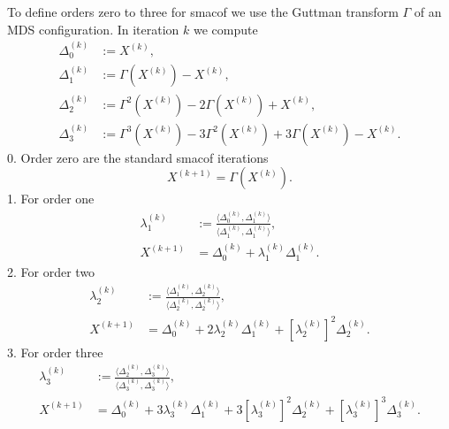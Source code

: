 \documentclass[
  12pt,
  letterpaper,
  DIV=11,
  numbers=noendperiod]{scrartcl}
\begin{document}
To define orders zero to three for smacof we use the Guttman transform
\(\Gamma\) of an MDS configuration. In iteration \(k\) we compute
\begin{subequations}
  \begin{align}
    \Delta_0^{(k)} & := X^{(k)},                                                             \\
    \Delta_1^{(k)} & := \Gamma(X^{(k)}) - X^{(k)},                                           \\
    \Delta_2^{(k)} & := \Gamma^2(X^{(k)}) - 2\Gamma(X^{(k)}) + X^{(k)},                      \\
    \Delta_3^{(k)} & := \Gamma^3(X^{(k)}) - 3\Gamma^2(X^{(k)}) + 3\Gamma(X^{(k)}) - X^{(k)}.
  \end{align}
\end{subequations} 0. Order zero are the standard smacof iterations
\begin{equation}
  X^{(k+1)} = \Gamma(X^{(k)}).
\end{equation} 1. For order one \begin{subequations}
  \begin{align}
    \lambda_1^{(k)} & := \frac{\langle\Delta_0^{(k)},\Delta_1^{(k)}\rangle}{\langle\Delta_1^{(k)},\Delta_1^{(k)}\rangle}, \\
    X^{(k+1)}       & = \Delta_0^{(k)} + \lambda_1^{(k)}\Delta_1^{(k)}.
  \end{align}
\end{subequations} 2. For order two \begin{subequations}
  \begin{align}
    \lambda_2^{(k)} & := \frac{\langle\Delta_1^{(k)},\Delta_2^{(k)}\rangle}{\langle\Delta_2^{(k)},\Delta_2^{(k)}\rangle}, \\
    X^{(k+1)}       & = \Delta_0^{(k)} + 2\lambda_2^{(k)}\Delta_1^{(k)} + \left[ \lambda_2^{(k)} \right]^2\Delta_2^{(k)}.
  \end{align}
\end{subequations} 3. For order three \begin{subequations}
  \begin{align}
    \lambda_3^{(k)} & := \frac{\langle\Delta_2^{(k)},\Delta_3^{(k)}\rangle}{\langle\Delta_3^{(k)},\Delta_3^{(k)}\rangle},   \\
    X^{(k+1)}       & = \Delta_0^{(k)} + 3\lambda_3^{(k)}\Delta_1^{(k)} + 3\left[ \lambda_3^{(k)} \right]^2\Delta_2^{(k)} +
    \left[ \lambda_3^{(k)} \right]^3\Delta_3^{(k)}.
  \end{align}
\end{subequations}
\end{document}
